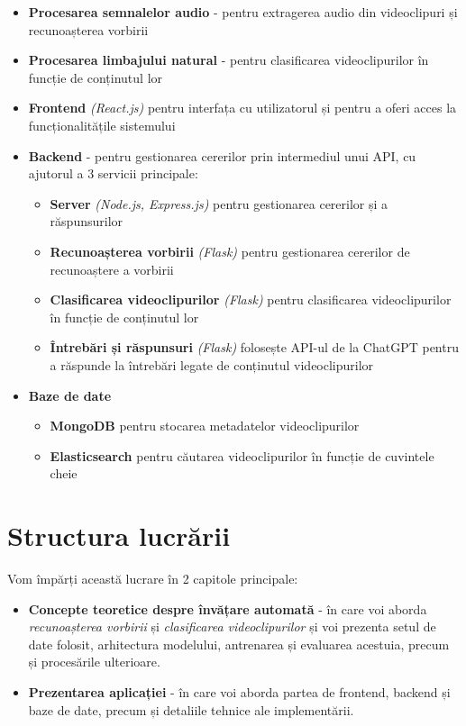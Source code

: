 \begin{itemize}
    \item \textbf{Procesarea semnalelor audio} - pentru extragerea audio din videoclipuri și recunoașterea vorbirii
    \item \textbf{Procesarea limbajului natural} - pentru clasificarea videoclipurilor în funcție de conținutul lor
    \item \textbf{Frontend} \textit{(React.js)} pentru interfața cu utilizatorul și pentru a oferi acces la funcționalitățile sistemului
    \item \textbf{Backend} - pentru gestionarea cererilor prin intermediul unui API, cu ajutorul a 3 servicii principale:
    \begin{itemize}
        \item \textbf{Server} \textit{(Node.js, Express.js)} pentru gestionarea cererilor și a răspunsurilor
        \item \textbf{Recunoașterea vorbirii} \textit{(Flask)} pentru gestionarea cererilor de recunoaștere a vorbirii
        \item \textbf{Clasificarea videoclipurilor} \textit{(Flask)} pentru clasificarea videoclipurilor în funcție de conținutul lor
        \item \textbf{Întrebări și răspunsuri} \textit{(Flask)} folosește API-ul de la ChatGPT pentru a răspunde la întrebări
        legate de conținutul videoclipurilor
    \end{itemize}
    \item \textbf{Baze de date} 
    \begin{itemize}
        \item \textbf{MongoDB} pentru stocarea metadatelor videoclipurilor
        \item \textbf{Elasticsearch} pentru căutarea videoclipurilor în funcție de cuvintele cheie
    \end{itemize}
\end{itemize}


\section{Structura lucrării}

Vom împărți această lucrare în 2 capitole principale:

\begin{itemize}
    \item \textbf{Concepte teoretice despre învățare automată} - în care voi aborda \textit{recunoașterea vorbirii} și 
    \textit{clasificarea videoclipurilor} și voi prezenta setul de date folosit, arhitectura modelului,
    antrenarea și evaluarea acestuia, precum și procesările ulterioare.
    \item \textbf{Prezentarea aplicației} - în care voi aborda partea de frontend, backend și baze de date,
    precum și detaliile tehnice ale implementării.
\end{itemize}